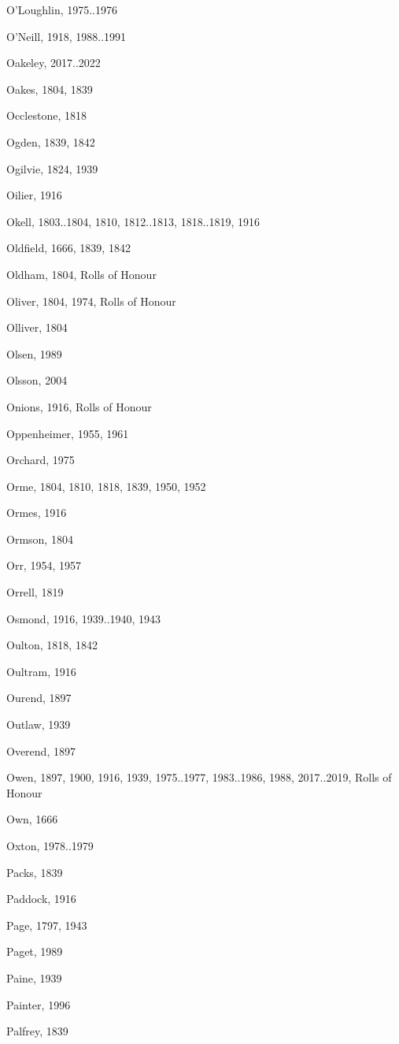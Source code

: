 \begin{theindex}
\item O'Loughlin, 1975..1976
\item O'Neill, 1918, 1988..1991
\item Oakeley, 2017..2022
\item Oakes, 1804, 1839
\item Occlestone, 1818
\item Ogden, 1839, 1842
\item Ogilvie, 1824, 1939
\item Oilier, 1916
\item Okell, 1803..1804, 1810, 1812..1813, 1818..1819, 1916
\item Oldfield, 1666, 1839, 1842
\item Oldham, 1804, Rolls of Honour
\item Oliver, 1804, 1974, Rolls of Honour
\item Olliver, 1804
\item Olsen, 1989
\item Olsson, 2004
\item Onions, 1916, Rolls of Honour
\item Oppenheimer, 1955, 1961
\item Orchard, 1975
\item Orme, 1804, 1810, 1818, 1839, 1950, 1952
\item Ormes, 1916
\item Ormson, 1804
\item Orr, 1954, 1957
\item Orrell, 1819
\item Osmond, 1916, 1939..1940, 1943
\item Oulton, 1818, 1842
\item Oultram, 1916
\item Ourend, 1897
\item Outlaw, 1939
\item Overend, 1897
\item Owen, 1897, 1900, 1916, 1939, 1975..1977, 1983..1986, 1988, 2017..2019, Rolls of Honour
\item Own, 1666
\item Oxton, 1978..1979
\item Packs, 1839
\item Paddock, 1916
\item Page, 1797, 1943
\item Paget, 1989
\item Paine, 1939
\item Painter, 1996
\item Palfrey, 1839

\end{theindex}
